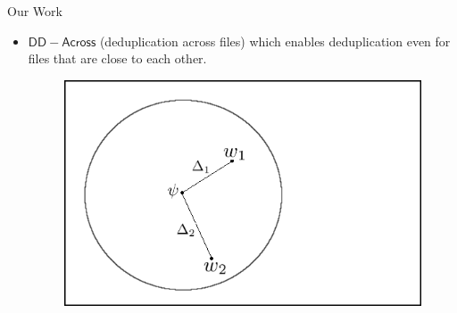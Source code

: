 \documentclass{beamer}
\newcommand{\scheme}{\mathsf{DD-Across}}
\begin{document}
\begin{frame}{Our Work}
	\begin{itemize}
		\setlength\itemsep{1em}
		\item $\scheme$ (deduplication across files) which enables deduplication even for files that are close to
	each other.
	    \begin{figure}[H]
	\includegraphics[scale=0.35]{example.png}
	\label{fig:example}
	\end{figure}
	\end{itemize}
\end{frame}

%
%

%
\end{document}
